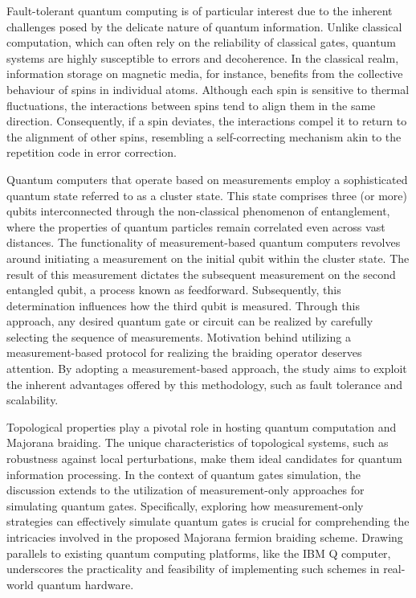 \documentclass{article}
\begin{document}
Fault-tolerant quantum computing is of particular interest due to the inherent challenges posed by the delicate nature of quantum information. Unlike classical computation, which can often rely on the reliability of classical gates, quantum systems are highly susceptible to errors and decoherence. In the classical realm, information storage on magnetic media, for instance, benefits from the collective behaviour of spins in individual atoms. Although each spin is sensitive to thermal fluctuations, the interactions between spins tend to align them in the same direction. Consequently, if a spin deviates, the interactions compel it to return to the alignment of other spins, resembling a self-correcting mechanism akin to the repetition code in error correction.\cite{Kitaev_2003}

Quantum computers that operate based on measurements employ a sophisticated quantum state referred to as a cluster state. This state comprises three (or more) qubits interconnected through the non-classical phenomenon of entanglement, where the properties of quantum particles remain correlated even across vast distances. The functionality of measurement-based quantum computers revolves around initiating a measurement on the initial qubit within the cluster state. The result of this measurement dictates the subsequent measurement on the second entangled qubit, a process known as feedforward. Subsequently, this determination influences how the third qubit is measured. Through this approach, any desired quantum gate or circuit can be realized by carefully selecting the sequence of measurements.\cite{quantum_comp} Motivation behind utilizing a measurement-based protocol for realizing the braiding operator deserves attention. By adopting a measurement-based approach, the study aims to exploit the inherent advantages offered by this methodology, such as fault tolerance and scalability.

Topological properties play a pivotal role in hosting quantum computation and Majorana braiding. The unique characteristics of topological systems, such as robustness against local perturbations, make them ideal candidates for quantum information processing. In the context of quantum gates simulation, the discussion extends to the utilization of measurement-only approaches for simulating quantum gates. Specifically, exploring how measurement-only strategies can effectively simulate quantum gates is crucial for comprehending the intricacies involved in the proposed Majorana fermion braiding scheme. Drawing parallels to existing quantum computing platforms, like the IBM Q computer, underscores the practicality and feasibility of implementing such schemes in real-world quantum hardware.
\end{document}
